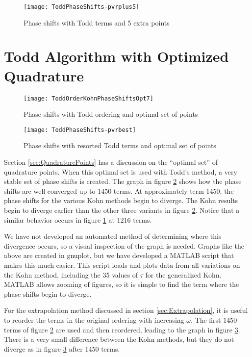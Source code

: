 \documentclass[Dissertation.tex]{subfiles}
\begin{document}
\begin{figure}[H]
	\centering
	\texttt{[image: ToddPhaseShifts-pvrplus5]}
	\caption{Phase shifts with Todd terms and 5 extra points}
	\label{fig:ToddPhaseShifts-pvrplus5}
\end{figure}


\section{Todd Algorithm with Optimized Quadrature}


\begin{figure}[H]
	\centering
	\texttt{[image: ToddOrderKohnPhaseShiftsOpt7]}
	\caption{Phase shifts with Todd ordering and optimal set of points}
	\label{fig:ToddOrderKohnPhaseShiftsOpt7}
\end{figure}


\begin{figure}[H]
	\centering
	\texttt{[image: ToddPhaseShifts-pvrbest]}
	\caption{Phase shifts with resorted Todd terms and optimal set of points}
	\label{fig:ToddPhaseShifts-pvroptimized}
\end{figure}

Section \ref{sec:QuadraturePoints} has a discussion on the ``optimal set'' of quadrature points. When this optimal set is used with Todd's method, a very stable set of phase shifts is created. The graph in figure \ref{fig:ToddOrderKohnPhaseShiftsOpt7} shows how the phase shifts are well converged up to 1450 terms. At approximately term 1450, the phase shifts for the various Kohn methods begin to diverge. The Kohn results begin to diverge earlier than the other three variants in figure \ref{fig:ToddOrderKohnPhaseShiftsOpt7}. Notice that a similar behavior occurs in figure \ref{fig:ToddPhaseShifts-pvrplus5} at 1216 terms.

We have not developed an automated method of determining where this divergence occurs, so a visual inspection of the graph is needed. Graphs like the above are created in gnuplot, but we have developed a MATLAB script that makes this much easier. This script loads and plots data from all variations on the Kohn method, including the 35 values of $\tau$ for the generalized Kohn. MATLAB allows zooming of figures, so it is simple to find the term where the phase shifts begin to diverge.

For the extrapolation method discussed in section \ref{sec:Extrapolation}, it is useful to reorder the terms in the original ordering with increasing $\omega$. The first 1450 terms of figure \ref{fig:ToddOrderKohnPhaseShiftsOpt7} are used and then reordered, leading to the graph in figure \ref{fig:ToddPhaseShifts-pvroptimized}. There is a very small difference between the Kohn methods, but they do not diverge as in figure \ref{fig:ToddPhaseShifts-pvroptimized} after 1450 terms.
\end{document}
